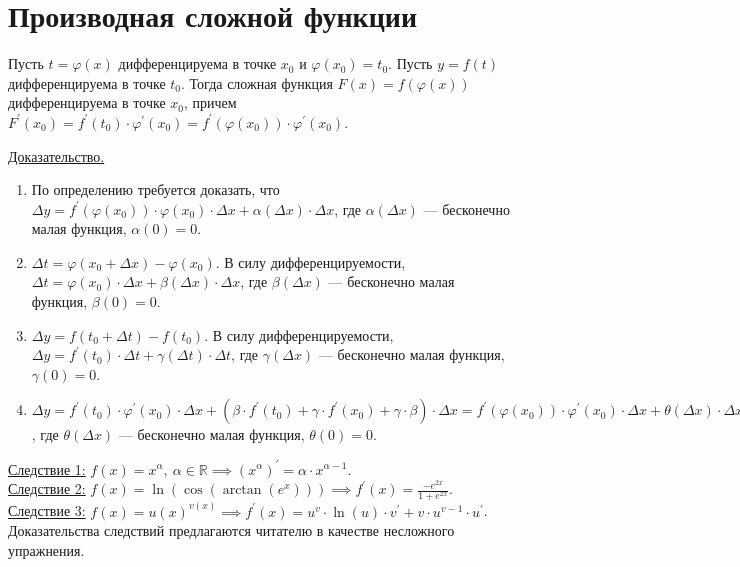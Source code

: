 \documentclass{article}
\begin{document}
\section*{Производная сложной функции}
\begin{theorem}
    Пусть \(t = \varphi(x)\) дифференцируема в точке \(x_0\) и \(\varphi(x_0) = t_0\). Пусть \(y = f(t)\) дифференцируема в точке \(t_0\).
    Тогда сложная функция \(F(x) = f(\varphi(x))\) дифференцируема в точке \(x_0\), причем \(F^{\prime}(x_0) = f^{\prime}(t_0) \cdot \varphi^{\prime}(x_0) = f^{\prime}(\varphi(x_0)) \cdot \varphi^{\prime}(x_0)\).       
\end{theorem}
\noindent
\underline{Доказательство.}
\begin{enumerate}
    \item По определению требуется доказать, что \(\Delta y = f^{\prime}(\varphi(x_0)) \cdot \varphi(x_0) \cdot \Delta x + \alpha(\Delta x) \cdot \Delta x\), где \(\alpha(\Delta x)\) --- бесконечно малая функция, \(\alpha(0) = 0\).   
    \item \(\Delta t = \varphi(x_0 + \Delta x) - \varphi(x_0)\). В силу дифференцируемости, \(\Delta t = \varphi(x_0) \cdot \Delta x + \beta(\Delta x) \cdot \Delta x\), где \(\beta (\Delta x)\) --- бесконечно малая функция, \(\beta (0) = 0\).
    \item \(\Delta y = f(t_0 + \Delta t) - f(t_0)\). В силу дифференцируемости, \(\Delta y = f^{\prime}(t_0) \cdot \Delta t + \gamma(\Delta t) \cdot \Delta t\), где \(\gamma (\Delta x)\) --- бесконечно малая функция, \(\gamma (0) = 0\).
    \item \(\Delta y = f^{\prime}(t_0) \cdot \varphi^{\prime}(x_0) \cdot \Delta x + (\beta \cdot f^{\prime}(t_0) + \gamma \cdot f^{\prime}(x_0) + \gamma \cdot \beta) \cdot \Delta x = f^{\prime}(\varphi(x_0)) \cdot \varphi^{\prime}(x_0) \cdot \Delta x + \theta(\Delta x) \cdot \Delta x\), где \(\theta (\Delta x)\) --- бесконечно малая функция, \(\theta (0) = 0\).
\end{enumerate}
\noindent
\underline{Следствие 1:} \(f(x) = x^{\alpha},\ \alpha \in \mathbb{R} \implies (x^{\alpha})^{\prime} = \alpha \cdot x^{\alpha -1}\).\\[0.15cm]
\underline{Следствие 2:} \(\displaystyle f(x) = \ln(\cos(\arctan(e^x))) \implies f^{\prime}(x) = \frac{-e^{2x}}{1 + e^{2x}}\).\\
\underline{Следствие 3:} \(\displaystyle f(x) = u(x)^{v(x)} \implies f^{\prime}(x) = u^v \cdot \ln(u) \cdot v^{\prime} + v \cdot u^{v - 1} \cdot u^{\prime}\).\\[0.15cm]
Доказательства следствий предлагаются читателю в качестве несложного упражнения.
\end{document}
